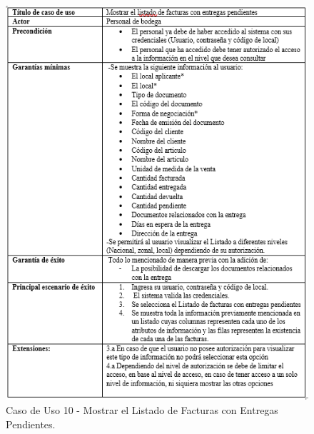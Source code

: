 \documentclass{scrreprt}
\begin{document}
\begin{figure}[!htpb]
    \centerline{\includegraphics[scale=.90]{images/case_stiff/10.png}}
    \caption{Caso de Uso 10 - Mostrar el Listado de Facturas con Entregas Pendientes.}
    \label{fig}
\end{figure}
\FloatBarrier
\end{document}
